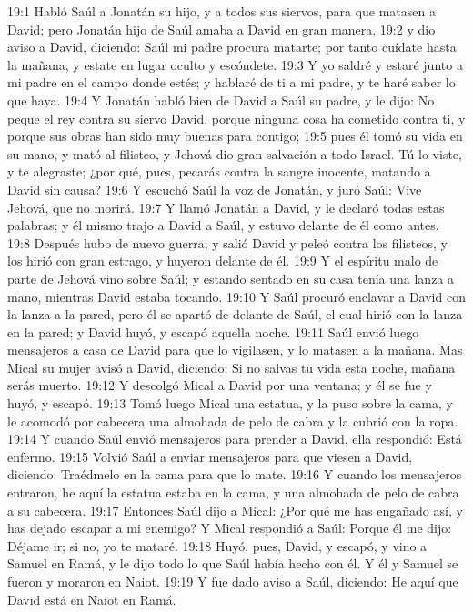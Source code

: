 19:1 Habló Saúl a Jonatán su hijo, y a todos sus siervos, para que matasen a David; pero Jonatán hijo de Saúl amaba a David en gran manera,  
19:2 y dio aviso a David, diciendo: Saúl mi padre procura matarte; por tanto cuídate hasta la mañana, y estate en lugar oculto y escóndete.  
19:3 Y yo saldré y estaré junto a mi padre en el campo donde estés; y hablaré de ti a mi padre, y te haré saber lo que haya.  
19:4 Y Jonatán habló bien de David a Saúl su padre, y le dijo: No peque el rey contra su siervo David, porque ninguna cosa ha cometido contra ti, y porque sus obras han sido muy buenas para contigo;  
19:5 pues él tomó su vida en su mano, y mató al filisteo, y Jehová dio gran salvación a todo Israel. Tú lo viste, y te alegraste; ¿por qué, pues, pecarás contra la sangre inocente, matando a David sin causa?  
19:6 Y escuchó Saúl la voz de Jonatán, y juró Saúl: Vive Jehová, que no morirá.  
19:7 Y llamó Jonatán a David, y le declaró todas estas palabras; y él mismo trajo a David a Saúl, y estuvo delante de él como antes.  
19:8 Después hubo de nuevo guerra; y salió David y peleó contra los filisteos, y los hirió con gran estrago, y huyeron delante de él.  
19:9 Y el espíritu malo de parte de Jehová vino sobre Saúl; y estando sentado en su casa tenía una lanza a mano, mientras David estaba tocando. 
19:10 Y Saúl procuró enclavar a David con la lanza a la pared, pero él se apartó de delante de Saúl, el cual hirió con la lanza en la pared; y David huyó, y escapó aquella noche.  
19:11 Saúl envió luego mensajeros a casa de David para que lo vigilasen, y lo matasen a la mañana. Mas Mical su mujer avisó a David, diciendo: Si no salvas tu vida esta noche, mañana serás muerto.  
19:12 Y descolgó Mical a David por una ventana; y él se fue y huyó, y escapó.  
19:13 Tomó luego Mical una estatua, y la puso sobre la cama, y le acomodó por cabecera una almohada de pelo de cabra y la cubrió con la ropa.  
19:14 Y cuando Saúl envió mensajeros para prender a David, ella respondió: Está enfermo.  
19:15 Volvió Saúl a enviar mensajeros para que viesen a David, diciendo: Traédmelo en la cama para que lo mate.  
19:16 Y cuando los mensajeros entraron, he aquí la estatua estaba en la cama, y una almohada de pelo de cabra a su cabecera.  
19:17 Entonces Saúl dijo a Mical: ¿Por qué me has engañado así, y has dejado escapar a mi enemigo? Y Mical respondió a Saúl: Porque él me dijo: Déjame ir; si no, yo te mataré.  
19:18 Huyó, pues, David, y escapó, y vino a Samuel en Ramá, y le dijo todo lo que Saúl había hecho con él. Y él y Samuel se fueron y moraron en Naiot.  
19:19 Y fue dado aviso a Saúl, diciendo: He aquí que David está en Naiot en Ramá.  
